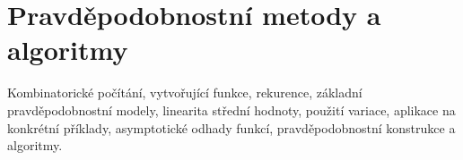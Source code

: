 \newpage
\section{Pravděpodobnostní metody a algoritmy}
\begin{pozadavky}
\begin{pitemize}
\item Kombinatorické počítání, vytvořující funkce, rekurence, základní pravděpodobnostní modely, linearita střední hodnoty, použití variace, aplikace na konkrétní příklady, asymptotické odhady funkcí, pravděpodobnostní konstrukce a algoritmy.
\end{pitemize}
\end{pozadavky}